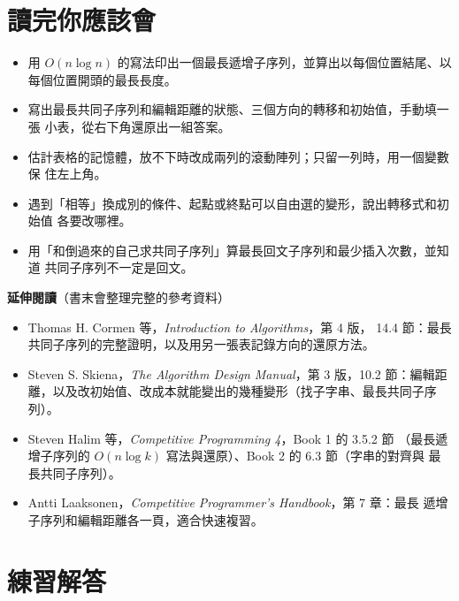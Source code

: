 \section{讀完你應該會}
\label{sec:ss-checklist}

\begin{itemize}
\item 用 $O(n \log n)$ 的寫法印出一個最長遞增子序列，並算出以每個位置結尾、以
每個位置開頭的最長長度。
\item 寫出最長共同子序列和編輯距離的狀態、三個方向的轉移和初始值，手動填一張
小表，從右下角還原出一組答案。
\item 估計表格的記憶體，放不下時改成兩列的滾動陣列；只留一列時，用一個變數保
住左上角。
\item 遇到「相等」換成別的條件、起點或終點可以自由選的變形，說出轉移式和初始值
各要改哪裡。
\item 用「和倒過來的自己求共同子序列」算最長回文子序列和最少插入次數，並知道
共同子序列不一定是回文。
\end{itemize}

\textbf{延伸閱讀}（書末會整理完整的參考資料）

\begin{itemize}
\item Thomas H. Cormen 等，\textit{Introduction to Algorithms}，第 4 版，
14.4 節：最長共同子序列的完整證明，以及用另一張表記錄方向的還原方法。
\item Steven S. Skiena，\textit{The Algorithm Design Manual}，第 3 版，10.2
節：編輯距離，以及改初始值、改成本就能變出的幾種變形（找子字串、最長共同子序
列）。
\item Steven Halim 等，\textit{Competitive Programming 4}，Book 1 的 3.5.2 節
（最長遞增子序列的 $O(n \log k)$ 寫法與還原）、Book 2 的 6.3 節（字串的對齊與
最長共同子序列）。
\item Antti Laaksonen，\textit{Competitive Programmer's Handbook}，第 7 章：最長
遞增子序列和編輯距離各一頁，適合快速複習。
\end{itemize}

\section*{練習解答}


